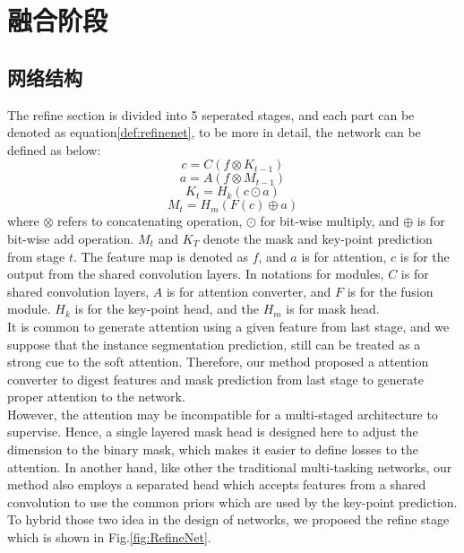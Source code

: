 \section{融合阶段}
\label{sec:refine}
\subsection{网络结构}
\label{subsec:architecture}
The refine section is divided into 5 seperated stages, and each part can be denoted as equation\eqref{def:refinenet}, to be more in detail, the network can be defined as below:
\begin{equation}
c = C({f}\otimes{K_{t-1}})
\end{equation}
\begin{equation}
a = A(f\otimes{M_{t-1}})
\end{equation}
\begin{equation}
K_t = H_k(c\odot a)
\end{equation}
\begin{equation}
M_t = H_m(F(c) \oplus a)
\end{equation}
where $\otimes$ refers to concatenating operation, $\odot$ for bit-wise multiply, and $\oplus$ is for bit-wise add operation. $M_t$ and $K_T$ denote the mask and key-point prediction from stage $t$. The feature map is denoted as $f$, and $a$ is for attention, $c$ is for the output from the shared convolution layers. In notations for modules, $C$ is for shared convolution layers, $A$ is for attention converter, and $F$ is for the fusion module. $H_k$ is for the key-point head, and the $H_m$ is for mask head.\\
It is common to generate attention using a given feature from last stage, and we suppose that the instance segmentation prediction, still can be treated as a strong cue to the soft attention. Therefore, our method proposed a attention converter to digest features and mask prediction from last stage to generate proper attention to the network.\\
However, the attention may be incompatible for a multi-staged architecture to supervise. Hence, a single layered mask head is designed here to adjust the dimension to the binary mask, which makes it easier to define losses to the attention. In another hand, like other the traditional multi-tasking networks, our method also employs a separated head which accepts features from a shared convolution to use the common priors which are used by the key-point prediction. To hybrid those two idea in the design of networks, we proposed the refine stage which is shown in Fig.\ref{fig:RefineNet}.\\

